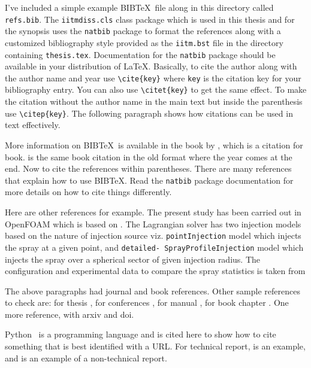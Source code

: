 I've included a simple example BIB\TeX\ file along in this directory
called \verb+refs.bib+.  The \verb+iitmdiss.cls+ class package which
is used in this thesis and for the synopsis uses the \verb+natbib+
package to format the references along with a customized bibliography
style provided as the \verb+iitm.bst+ file in the directory containing
\verb+thesis.tex+.  Documentation for the \verb+natbib+ package should
be available in your distribution of \LaTeX.  Basically, to cite the
author along with the author name and year use \verb+\cite{key}+ where
\verb+key+ is the citation key for your bibliography entry.  You can
also use \verb+\citet{key}+ to get the same effect.  To make the
citation without the author name in the main text but inside the
parenthesis use \verb+\citep{key}+.  The following paragraph shows how
citations can be used in text effectively.

More information on BIB\TeX\ is available in the book by
\cite{lamport:86}, which is a citation for book. \cite{lamport1:86} is
the same book citation in the old format where the year comes at the end.
 Now to cite the references within parentheses. There are many 
references~\citep{lamport:86} that explain 
how to use BIB\TeX.  Read the \verb+natbib+ package documentation 
for more details on how to cite things differently.

Here are other references for example.  The present study has been 
carried out in OpenFOAM which is based on \cite{Weller1998}. 
The Lagrangian solver has two injection models based on the nature 
of injection source viz. \texttt{pointInjection} model which injects
the spray at a given point, and \texttt{detailed- SprayProfileInjection}
model which injects the spray over a spherical sector of given injection
radius. The configuration and experimental data to compare the spray
statistics is taken from \cite{Zhou2015a}

The above paragraphs had journal and book references.
Other sample references to check are: for thesis \cite{Syed2013,
Cheekati2014,Syed2020}, for conferences \cite{Sasidharan2017,Syed2018,
Syed2018a}, for manual \cite{Ayachit2015},  for book chapter \cite{Ahren2005}.
One more reference, \cite{Roenby2016} with arxiv and doi.

Python~\citep{py:python} is a programming language and is
cited here to show how to cite something that is best identified with
a URL. For technical report, \cite{Syed2015} is an example,
and \cite{UnitedNations2019} is an example of a non-technical report.

